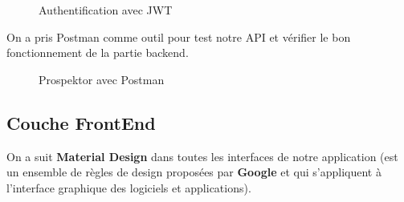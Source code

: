 \begin{figure}[H]
	\caption{\label{fig:my-label} Authentification avec JWT}
\end{figure}

On a pris Postman comme outil pour test notre \gls{API} et v\'erifier le bon fonctionnement de la partie backend.

\begin{figure}[H]
	\caption{\label{fig:my-label} Prospektor avec Postman}
\end{figure}

\subsection{Couche FrontEnd}

On a suit \textbf{Material Design} dans toutes les interfaces de notre application (est un ensemble de r\`egles de design propos\'ees par \textbf{Google} et qui s'appliquent \`a l'interface graphique des logiciels et applications).

